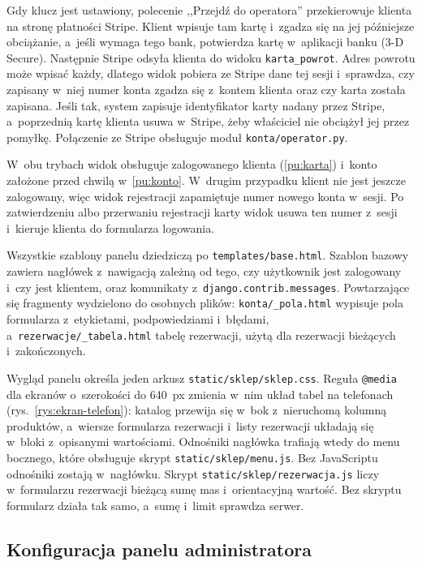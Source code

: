 \documentclass[12pt,a4paper,oneside]{article}
\newcounter{pu}
\begin{document}
Gdy klucz jest ustawiony, polecenie ,,Przejdź do operatora'' przekierowuje klienta na stronę płatności Stripe. Klient wpisuje tam kartę i~zgadza się na jej późniejsze obciążanie, a~jeśli wymaga tego bank, potwierdza kartę w~aplikacji banku (3-D Secure). Następnie Stripe odsyła klienta do widoku \texttt{karta\_powrot}. Adres powrotu może wpisać każdy, dlatego widok pobiera ze Stripe dane tej sesji i~sprawdza, czy zapisany w~niej numer konta zgadza się z~kontem klienta oraz czy karta została zapisana. Jeśli tak, system zapisuje identyfikator karty nadany przez Stripe, a~poprzednią kartę klienta usuwa w~Stripe, żeby właściciel nie obciążył jej przez pomyłkę. Połączenie ze Stripe obsługuje moduł \texttt{konta/operator.py}.

W~obu trybach widok obsługuje zalogowanego klienta (\ref{pu:karta}) i~konto założone przed chwilą w~\ref{pu:konto}. W~drugim przypadku klient nie jest jeszcze zalogowany, więc widok rejestracji zapamiętuje numer nowego konta w~sesji. Po zatwierdzeniu albo przerwaniu rejestracji karty widok usuwa ten numer z~sesji i~kieruje klienta do formularza logowania.

Wszystkie szablony panelu dziedziczą po \texttt{templates/base.html}. Szablon bazowy zawiera nagłówek z~nawigacją zależną od tego, czy użytkownik jest zalogowany i~czy jest klientem, oraz komunikaty z~\texttt{django.contrib.messages}. Powtarzające się fragmenty wydzielono do osobnych plików: \texttt{konta/\_pola.html} wypisuje pola formularza z~etykietami, podpowiedziami i~błędami, a~\texttt{rezerwacje/\_tabela.html} tabelę rezerwacji, użytą dla rezerwacji bieżących i~zakończonych.

Wygląd panelu określa jeden arkusz \texttt{static/sklep/sklep.css}. Reguła \texttt{@media} dla ekranów o~szerokości do 640~px zmienia w~nim układ tabel na telefonach (rys.~\ref{rys:ekran-telefon}): katalog przewija się w~bok z~nieruchomą kolumną produktów, a~wiersze formularza rezerwacji i~listy rezerwacji układają się w~bloki z~opisanymi wartościami. Odnośniki nagłówka trafiają wtedy do menu bocznego, które obsługuje skrypt \texttt{static/sklep/menu.js}. Bez JavaScriptu odnośniki zostają w~nagłówku. Skrypt \texttt{static/sklep/rezerwacja.js} liczy w~formularzu rezerwacji bieżącą sumę mas i~orientacyjną wartość. Bez skryptu formularz działa tak samo, a~sumę i~limit sprawdza serwer.


\subsection{Konfiguracja panelu administratora}
\label{sec:konfiguracja-admina}
\end{document}
